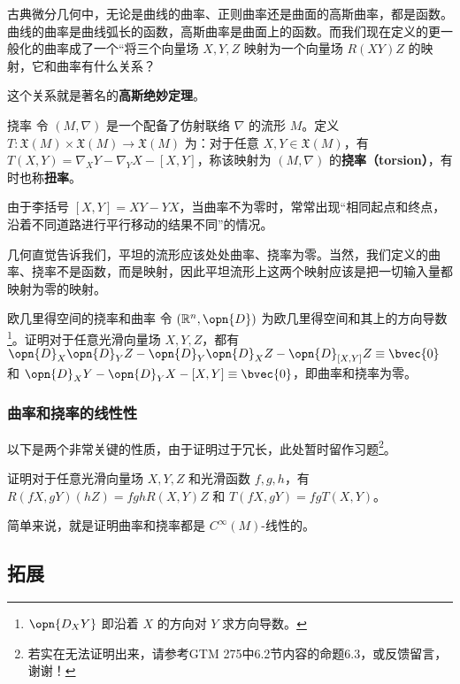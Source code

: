 古典微分几何中，无论是曲线的曲率、正则曲率还是曲面的高斯曲率，都是函数。曲线的曲率是曲线弧长的函数，高斯曲率是曲面上的函数。而我们现在定义的更一般化的曲率成了一个“将三个向量场 $X, Y, Z$ 映射为一个向量场 $R(XY)Z$ 的映射，它和曲率有什么关系？

这个关系就是著名的\textbf{高斯绝妙定理}。


\begin{definition}{挠率}
令 $(M, \nabla)$ 是一个配备了仿射联络 $\nabla$ 的流形 $M$。定义 $T:\mathfrak{X}(M)\times\mathfrak{X}(M)\to\mathfrak{X}(M)$ 为：对于任意 $X, Y\in\mathfrak{X}(M)$，有 $T(X, Y)=\nabla_XY-\nabla_YX-{[X, Y]}$，称该映射为 $(M, \nabla)$ 的\textbf{挠率（torsion）}，有时也称\textbf{扭率}。
\end{definition}

由于李括号 $[X, Y]=XY-YX$，当曲率不为零时，常常出现“相同起点和终点，沿着不同道路进行平行移动的结果不同”的情况。

几何直觉告诉我们，平坦的流形应该处处曲率、挠率为零。当然，我们定义的曲率、挠率不是函数，而是映射，因此平坦流形上这两个映射应该是把一切输入量都映射为零的映射。

\begin{exercise}{欧几里得空间的挠率和曲率}
令 $(\mathbb{R}^n, \opn{D})$ 为欧几里得空间和其上的方向导数\footnote{$\opn{D_XY}$ 即沿着 $X$ 的方向对 $Y$ 求方向导数。}。证明对于任意光滑向量场 $X, Y, Z$，都有 $\opn{D}_X\opn{D}_YZ-\opn{D}_Y\opn{D}_XZ-\opn{D}_{[X, Y]}Z\equiv\bvec{0}$ 和 $\opn{D}_XY-\opn{D}_YX-{[X, Y]}\equiv\bvec{0}$，即曲率和挠率为零。
\end{exercise}

\subsubsection{曲率和挠率的线性性}

以下是两个非常关键的性质，由于证明过于冗长，此处暂时留作习题\footnote{若实在无法证明出来，请参考GTM 275\cite{GTM275}中6.2节内容的命题6.3，或反馈留言，谢谢！}。

\begin{exercise}{}\label{exe_affcon_1}
证明对于任意光滑向量场 $X, Y, Z$ 和光滑函数 $f, g, h$，有 $R(fX, gY)(hZ)=fghR(X, Y)Z$ 和 $T(fX, gY)=fgT(X, Y)$。

简单来说，就是证明曲率和挠率都是 $C^{\infty}(M)$-线性的。
\end{exercise}





\subsection{拓展}

